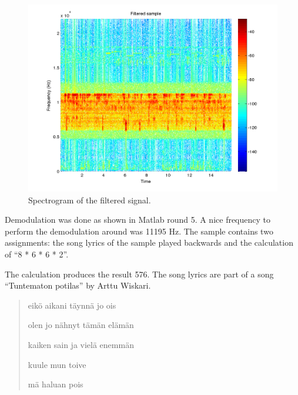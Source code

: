 \begin{figure}
  \begin{center}
    \hspace*{-1in}
    \includegraphics[width=180mm]{q1_filtered_spectrogram}
    \caption{Spectrogram of the filtered signal. 
      \label{fig:q1_filtered_spectrogram}}
  \end{center}  
\end{figure}

Demodulation was done as shown in Matlab round 5.  A nice frequency to
perform the demodulation around was 11195 Hz.  The sample contains two
assignments: the song lyrics of the sample played backwards and
the calculation of ``8 * 6 * 6 * 2''.

The calculation produces the result 576.  The song lyrics are part of a
song ``Tuntematon potilas'' by Arttu Wiskari\cite{wiskari2010}.

\begin{quotation}
eikö aikani täynnä jo ois

olen jo nähnyt tämän elämän

kaiken sain ja vielä enemmän

kuule mun toive

mä haluan pois
\end{quotation}
